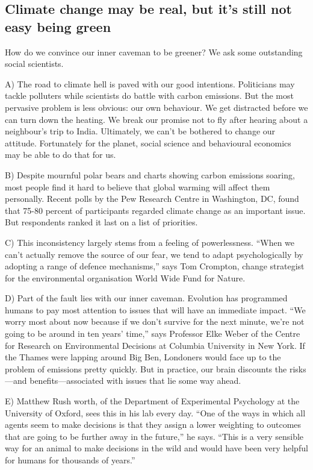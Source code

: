 \documentclass[UTF8,11pt]{ctexart}
\begin{document}
\subsection*{\textbf{Climate change may be real, but it’s still not easy being green}}


How do we convince our inner caveman to be greener? We ask some outstanding social scientists.


A) The road to climate hell is paved with our good intentions. Politicians may tackle polluters while scientists do battle with carbon emissions. But the most pervasive problem is less obvious: our own behaviour. We get distracted before we can turn down the heating. We break our promise not to fly after hearing about a neighbour’s trip to India. Ultimately, we can’t be bothered to change our attitude. Fortunately for the planet, social science and behavioural economics may be able to do that for us.


B) Despite mournful polar bears and charts showing carbon emissions soaring, most people find it hard to believe that global warming will affect them personally. Recent polls by the Pew Research Centre in Washington, DC, found that 75-80 percent of participants regarded climate change as an important issue. But respondents ranked it last on a list of priorities.


C) This inconsistency largely stems from a feeling of powerlessness. “When we can’t actually remove the source of our fear, we tend to adapt psychologically by adopting a range of defence mechanisms,” says Tom Crompton, change strategist for the environmental organisation World Wide Fund for Nature.


D) Part of the fault lies with our inner caveman. Evolution has programmed humans to pay most attention to issues that will have an immediate impact. “We worry most about now because if we don’t survive for the next minute, we’re not going to be around in ten years’ time,” says Professor Elke Weber of the Centre for Research on Environmental Decisions at Columbia University in New York. If the Thames were lapping around Big Ben, Londoners would face up to the problem of emissions pretty quickly. But in practice, our brain discounts the risks —and benefits—associated with issues that lie some way ahead.


E) Matthew Rush worth, of the Department of Experimental Psychology at the University of Oxford, sees this in his lab every day. “One of the ways in which all agents seem to make decisions is that they assign a lower weighting to outcomes that are going to be further away in the future,” he says. “This is a very sensible way for an animal to make decisions in the wild and would have been very helpful for humans for thousands of years.”
\end{document}
